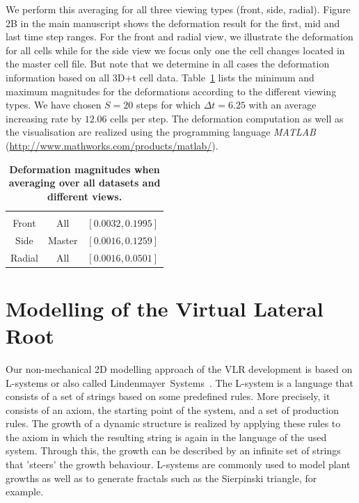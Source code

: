 \documentclass[11pt,a4paper, draft]{article}
\begin{document}
We perform this averaging for all three viewing types (front, side, radial). Figure 2B in the main manuscript shows the deformation result for the first, mid and last time step ranges. For the front and radial view, we illustrate the deformation for all cells while for the side view we focus only one the cell changes located in the master cell file. But note that we determine in all cases the deformation information based on all 3D+t cell data. Table~\ref{tab:deformationParameters} lists the minimum and maximum magnitudes for the deformations according to the different viewing types. We have chosen $S=20$ steps for which $\Delta t = 6.25$ with an average increasing rate by $12.06$ cells per step. The deformation computation as well as the visualisation are realized using the programming language \textit{MATLAB} (\href{http://www.mathworks.com/products/matlab/}{http://www.mathworks.com/products/matlab/}).
%
\begin{table}
	\begin{center}
		\begin{tabular}[h]{c|c|c}
		\multirow{2}{*}{\parbox{1.4cm}{}} &
		\multirow{2}{*}{\parbox{1.4cm}{}} &
		\multirow{2}{*}{\parbox{6.0cm}{}}\\
		& &\\
		\hline
		\hline
		Front & All & $[ 0.0032, 0.1995 ]$\\
		\hline
		Side & Master & $[ 0.0016, 0.1259 ]$\\
		\hline
		Radial & All & $[ 0.0016, 0.0501 ]$\\
		\end{tabular}
	\end{center}
	\caption[Deformation magnitudes when averaging over all datasets and different views.]{\textbf{Deformation magnitudes when averaging over all datasets and different views.}
	}
	\label{tab:deformationParameters}
\end{table}
%

\section{Modelling of the Virtual Lateral Root}
\noindent
Our non-mechanical 2D modelling approach of the VLR development is based on L-systems or also called Lindenmayer~Systems~\cite{lindenmayer_1968, prusinkiewicz_lindenmayer_1990}. The L-system is a language that consists of a set of strings based on some predefined rules. More precisely, it consists of an axiom, the starting point of the system, and a set of production rules. The growth of a dynamic structure is realized by applying these rules to the axiom in which the resulting string is again in the language of the used system. Through this, the growth can be described by an infinite set of strings that 'steers' the growth behaviour. L-systems are commonly used to model plant growths as well as to generate fractals such as the Sierpinski triangle, for example.
\end{document}
